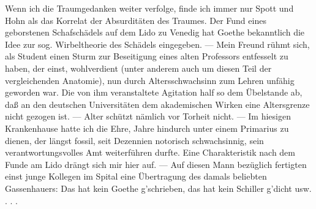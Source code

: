 \documentclass[twoside=true,titlepage=false,open=any, parskip=never, fontsize=10pt, headings=small, chapterprefix=false, appendixprefix=false]{scrbook}
\begin{document}
            
        \pstart
        Wenn ich die Traumgedanken weiter verfolge, finde ich immer nur Spott und Hohn als das Korrelat der Absurditäten des
                  Traumes. Der Fund eines geborstenen Schafschädels auf dem Lido zu
               Venedig hat Goethe bekanntlich die Idee zur sog.
               Wirbeltheorie des Schädels eingegeben. — Mein Freund rühmt sich, als Student
               einen Sturm zur Beseitigung eines alten Professors entfesselt zu haben, der
               einst, wohlverdient (unter anderem auch um diesen Teil der vergleichenden
               Anatomie), nun durch Altersschwachsinn zum
               Lehren unfähig geworden war. Die von ihm veranstaltete Agitation half so dem
               Übelstande ab, daß an den deutschen Universitäten dem akademischen Wirken
               eine Altersgrenze nicht gezogen ist. — Alter schützt nämlich vor Torheit nicht. — Im hiesigen
               Krankenhause hatte ich die Ehre, Jahre hindurch unter einem Primarius zu
               dienen, der längst fossil, seit Dezennien notorisch
                  schwachsinnig, sein verantwortungsvolles Amt weiterführen durfte. Eine
               Charakteristik nach dem Funde am Lido drängt sich mir hier auf. — Auf diesen
               Mann bezüglich fertigten einst junge Kollegen im Spital eine Übertragung des
               damals beliebten Gassenhauers: Das hat kein Goethe g’schrieben, das hat kein Schiller g’dicht usw. . . .
        \pend
    
         
            
            
            \pend
            
\end{document}

